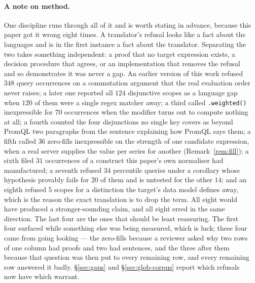 \paragraph{A note on method.}
One discipline runs through all of it and is worth stating in advance, because this paper
got it wrong eight times. A translator's refusal looks like a fact about the languages and
is in the first instance a fact about the translator. Separating the two takes something
independent: a proof that no target expression exists, a decision procedure that agrees,
or an implementation that removes the refusal and so demonstrates it was never a gap.
An earlier version of this work refused $348$ query occurrences on a commutation argument
that the real evaluation order never raises; a later one reported all $124$
disjunctive scopes as a language gap when $120$ of them were a single regex matcher away;
a third called \texttt{.weighted()} inexpressible for $70$ occurrences when the modifier
turns out to compute nothing at all; a fourth counted the four disjunctions no
single key covers as beyond PromQL two paragraphs from the sentence explaining how
PromQL says them; a fifth called $36$ zero-fills inexpressible on the strength of
one candidate expression, when a real server supplies the value per series for another
(Remark~\ref{rem:fill}); a sixth filed $31$ occurrences of a construct this paper's own
normaliser had manufactured; a seventh refused $34$ percentile queries under a
corollary whose hypothesis provably fails for $20$ of them and is untested for the
other $14$; and an eighth refused $5$ scopes for a distinction
the target's data model defines away, which is the reason the exact translation is to
drop the term. All eight
would have produced a stronger-sounding claim, and all eight erred in the same direction.
The last four are the ones that should be least reassuring. The first four surfaced
while something else was being measured, which is luck; these four came from going
looking --- the zero-fills because a reviewer asked why two rows of one column had
proofs and two had sentences, and the three after them because that question was then
put to every remaining row, and every remaining row answered it badly.
\S\ref{sec:gaps} and \S\ref{sec:glob-corpus} report which refusals now have which
warrant.

